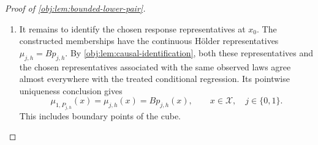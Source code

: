 \documentclass[11pt]{article}
\begin{document}
\begin{proof}[Proof of \cref{obj:lem:bounded-lower-pair}]
\begin{enumerate}
Both observed laws are obtained by integrating \(\mathsf Q_{j,x}\)
against the same uniform covariate law, and each conditional law
records its covariate \(x\) in the first coordinate. The entropy
disintegration identity therefore gives
\[
\operatorname{KL}(P_{0,h},P_{1,h})
=
\int_{\mathcal X}
\operatorname{KL}(\mathsf Q_{0,x},\mathsf Q_{1,x})\,dx.
\]
On \(E_h\), apply the conditional entropy and propensity bounds; on
its complement, the integrand is zero. Consequently,
\[
\begin{aligned}
\operatorname{KL}(P_{0,h},P_{1,h})
&\le
\frac{2}{\theta_0}(ah^\beta)^2
\bigl((2h)^d\bigr)^{1/(\gamma-1)}
\operatorname{vol}(E_h\cap\mathcal X)\\
&\le
\frac{2}{\theta_0}(ah^\beta)^2
\bigl((2h)^d\bigr)^{1/(\gamma-1)}(2h)^d\\
&=
\frac{2}{\theta_0}\,2^{D_\gamma}a^2h^{2\beta+D_\gamma}
=K_{\mathrm{KL}}a^2h^{\tau_{\mathrm{KL}}}.
\end{aligned}
\]
The last equality uses
\[
\frac{d}{\gamma-1}+d=D_\gamma.
\]
The finite entropy bound supplies both
\[
P_{0,h}\ll P_{1,h},
\qquad
\int
\left|\log\frac{dP_{0,h}}{dP_{1,h}}\right|\,dP_{0,h}<\infty.
\]

Finally, the oracle mesh satisfies
\[
h_{\gamma,n}^{\tau_{\mathrm{KL}}}=n^{-1},
\qquad
nh^{\tau_{\mathrm{KL}}}
=n(ch_{\gamma,n})^{\tau_{\mathrm{KL}}}
=c^{\tau_{\mathrm{KL}}}.
\]
The fixed calibration from the second step therefore gives
\[
n\operatorname{KL}(P_{0,h},P_{1,h})
\le K_{\mathrm{KL}}a^2c^{\tau_{\mathrm{KL}}}
\le\frac18.
\]

\item It remains to identify the chosen response representatives at
\(x_0\). The constructed memberships have the continuous Hölder
representatives \(\mu_{j,h}=Bp_{j,h}\). By
\cref{obj:lem:causal-identification}, both these representatives and the
chosen representatives associated with the same observed laws agree
almost everywhere with the treated conditional regression. Its
pointwise uniqueness conclusion gives
\[
\mu_{1,P_{j,h}}(x)=\mu_{j,h}(x)=Bp_{j,h}(x),
\qquad x\in\mathcal X,\quad j\in\{0,1\}.
\]
This includes boundary points of the cube.


\end{enumerate}
\end{proof}
\end{document}
